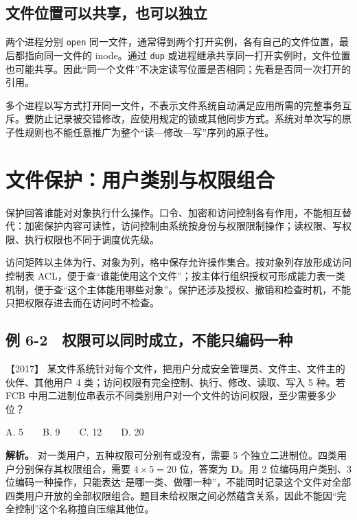 \subsection{文件位置可以共享，也可以独立}\label{os-c06-h50}

两个进程分别 \texttt{open} 同一文件，通常得到两个打开实例，各有自己的文件位置，最后都指向同一文件的 inode。通过 \texttt{dup} 或进程继承共享同一打开实例时，文件位置也可能共享。因此``同一个文件''不决定读写位置是否相同；先看是否同一次打开的引用。

多个进程以写方式打开同一文件，不表示文件系统自动满足应用所需的完整事务互斥。要防止记录被交错修改，应使用规定的锁或其他同步方式。系统对单次写的原子性规则也不能任意推广为整个``读---修改---写''序列的原子性。

\section{文件保护：用户类别与权限组合}\label{os-6-3}

保护回答谁能对对象执行什么操作。口令、加密和访问控制各有作用，不能相互替代：加密保护内容可读性，访问控制由系统按身份与权限限制操作；读权限、写权限、执行权限也不同于调度优先级。

访问矩阵以主体为行、对象为列，格中保存允许操作集合。按对象列存放形成访问控制表 ACL，便于查``谁能使用这个文件''；按主体行组织授权可形成能力表一类机制，便于查``这个主体能用哪些对象''。保护还涉及授权、撤销和检查时机，不能只把权限存进去而在访问时不检查。

\subsection{例 6-2　权限可以同时成立，不能只编码一种}\label{os-ex6-2}

\noindent{}【2017】 某文件系统针对每个文件，把用户分成安全管理员、文件主、文件主的伙伴、其他用户 4 类；访问权限有完全控制、执行、修改、读取、写入 5 种。若 FCB 中用二进制位串表示不同类别用户对一个文件的访问权限，至少需要多少位？

A. 5　　B. 9　　C. 12　　D. 20


\textbf{解析。} 对一类用户，五种权限可分别有或没有，需要 5 个独立二进制位。四类用户分别保存其权限组合，需要 \(4\times5=20\) 位，答案为 \textbf{D}。用 2 位编码用户类别、3 位编码一种操作，只能表达``是哪一类、做哪一种''，不能同时记录这个文件对全部四类用户开放的全部权限组合。题目未给权限之间必然蕴含关系，因此不能因``完全控制''这个名称擅自压缩其他位。

